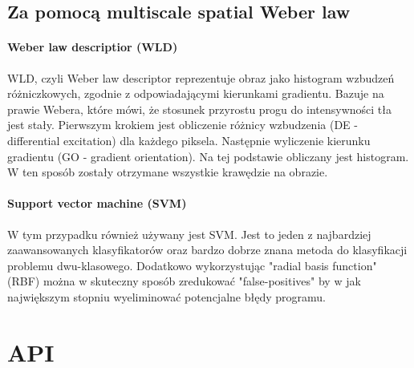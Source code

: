 \documentclass{sprawozdanie-agh}
\begin{document}
\subsection{Za pomocą multiscale spatial Weber law}
\paragraph{Weber law descriptior (WLD)\\}
WLD, czyli Weber law descriptor reprezentuje obraz jako histogram wzbudzeń różniczkowych, zgodnie z odpowiadającymi kierunkami gradientu. Bazuje na prawie Webera, które mówi, że stosunek przyrostu progu do intensywności tła jest stały. Pierwszym krokiem jest obliczenie różnicy wzbudzenia (DE - differential excitation) dla każdego piksela. Następnie wyliczenie kierunku gradientu (GO - gradient orientation). Na tej podstawie obliczany jest histogram. W ten sposób zostały otrzymane wszystkie krawędzie na obrazie.

\paragraph{Support vector machine (SVM)\\}
W tym przypadku również używany jest SVM. Jest to jeden z najbardziej zaawansowanych klasyfikatorów oraz bardzo dobrze znana metoda do klasyfikacji problemu dwu-klasowego. Dodatkowo wykorzystując "radial basis function" (RBF) można w skuteczny sposób zredukować "false-positives" by w jak największym stopniu wyeliminować potencjalne błędy programu.


\section{API}
\end{document}
